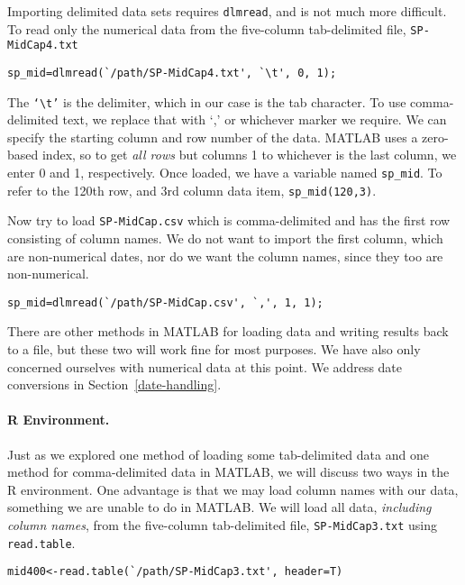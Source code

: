 Importing delimited data sets requires \texttt{dlmread}, and is not much more difficult. To read only the numerical data from the five-column  tab-delimited file, \texttt{SP-MidCap4.txt}
\begin{verbatim}
sp_mid=dlmread(`/path/SP-MidCap4.txt', `\t', 0, 1);
\end{verbatim}
The \texttt{`\textbackslash t'} is the delimiter, which in our case is the tab character. To use comma-delimited text, we replace that with `,' or whichever marker we require. We can specify the starting column and row number of the data. MATLAB uses a zero-based index, so to get \emph{all rows} but columns 1 to whichever is the last column, we enter 0 and 1, respectively. Once loaded, we have a variable named \texttt{sp\_mid}. To refer to the 120th row, and 3rd column data item, \texttt{sp\_mid(120,3)}.

Now try to load \texttt{SP-MidCap.csv} which is comma-delimited and has the first row consisting of column names. We do not want to import the first column, which are non-numerical dates, nor do we want the column names, since they too are non-numerical.
\begin{verbatim}
sp_mid=dlmread(`/path/SP-MidCap.csv', `,', 1, 1);
\end{verbatim}

There are other methods in MATLAB for loading data and writing results back to a file, but these two will work fine for most purposes. We have also only concerned ourselves with numerical data at this point. We address date conversions in Section~\ref{date-handling}.

\paragraph{R Environment.} Just as we explored one method of loading some tab-delimited data and one method for comma-delimited data in MATLAB, we will discuss two ways in the R environment. One advantage is that we may load column names with our data, something we are unable to do in MATLAB. We will load all data, \emph{including column names}, from the five-column  tab-delimited file, \texttt{SP-MidCap3.txt} using \texttt{read.table}.
\begin{verbatim}
mid400<-read.table(`/path/SP-MidCap3.txt', header=T)
\end{verbatim}

